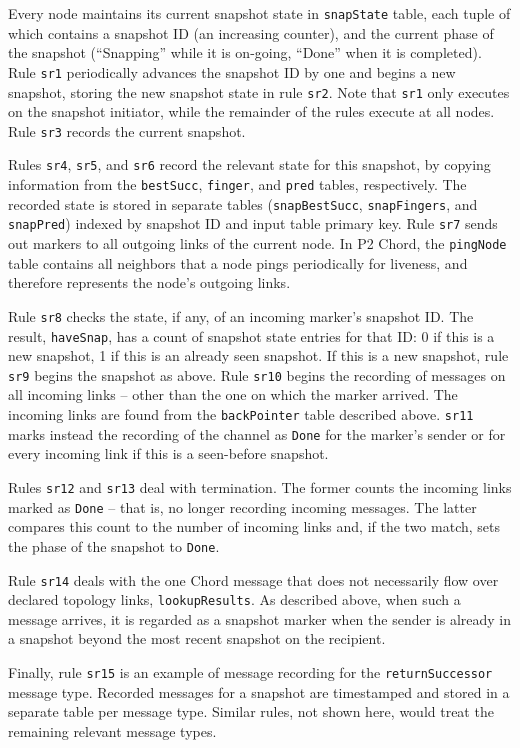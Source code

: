 \documentclass{sig-alt-full}
\newcommand{\ol}[1]{{\tt\footnotesize#1}}
\begin{document}
Every node maintains its current snapshot state in
\ol{snapState} table, each tuple of which contains a
snapshot ID (an increasing counter), and the current
phase of the snapshot (``Snapping'' while it is
on-going, ``Done'' when it is completed).  Rule
\ol{sr1} periodically advances the snapshot ID by one
and begins a new snapshot, storing the new snapshot
state in rule \ol{sr2}.  Note that \ol{sr1} only
executes on the snapshot initiator, while the
remainder of the rules execute at all nodes. Rule
\ol{sr3} records the current snapshot.

Rules \ol{sr4}, \ol{sr5}, and \ol{sr6} record the
relevant state for this snapshot, by copying
information from the \ol{bestSucc}, \ol{finger}, and
\ol{pred} tables, respectively.  The recorded state is
stored in separate tables
(\ol{snapBestSucc}, \ol{snapFingers}, and \ol{snapPred})
indexed by snapshot ID and input table primary key.
Rule \ol{sr7} sends out markers to all outgoing links
of the current node. In P2 Chord, the \ol{pingNode}
table contains all neighbors that a node pings
periodically for liveness, and therefore represents
the node's outgoing links.

Rule \ol{sr8} checks the state, if any, of an incoming marker's snapshot
ID.  The result, \ol{haveSnap}, has a count of snapshot state entries
for that ID: 0 if this is a
new snapshot, 1 if this is an already seen snapshot.
If this is a new snapshot, rule \ol{sr9} begins the
snapshot as above.  Rule \ol{sr10} begins the
recording of
messages on all incoming
links -- other than the one on which the
marker arrived.  The incoming links are found from the
\ol{backPointer} table described above.  \ol{sr11}
marks instead the recording of the channel as
\ol{Done} for the marker's sender or for every
incoming link if this is a seen-before snapshot.

Rules \ol{sr12} and \ol{sr13} deal with termination.
The former counts the incoming links marked as
\ol{Done} -- that is, no longer recording incoming
messages.  The latter compares this count to the
number of incoming links and, if the two match, sets
the phase of the snapshot to \ol{Done}.

Rule \ol{sr14} deals with the one Chord message that does
not necessarily flow over declared topology links,
\ol{lookupResults}.  As described above, when such a
message arrives, it is regarded as a snapshot marker
when the sender is already in a snapshot beyond the most
recent snapshot on the recipient.

Finally, rule \ol{sr15} is an example of message
recording for the \ol{returnSuccessor} message type.
Recorded messages for a snapshot are timestamped and
stored in a separate table per message type.  Similar
rules, not shown here, would treat the remaining
relevant message types.
\end{document}
